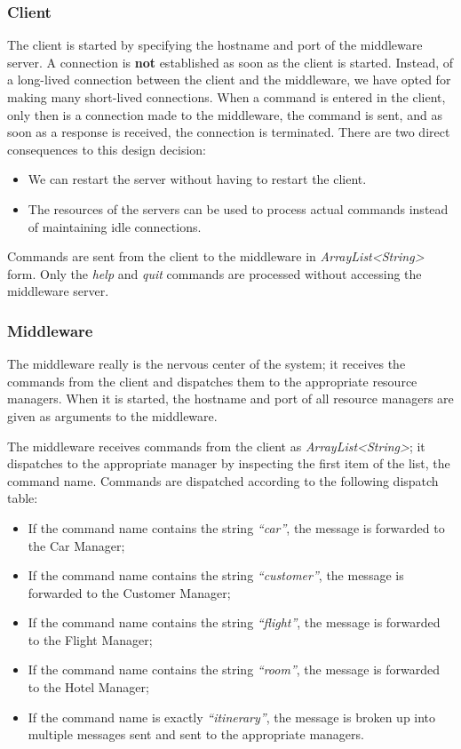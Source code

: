 \documentclass[11pt]{article}
\begin{document}
\subsubsection{Client}

The client is started by specifying the hostname and port of the
middleware server.  A connection is {\bf not} established as soon as
the client is started.  Instead, of a long-lived connection between
the client and the middleware, we have opted for making many
short-lived connections.  When a command is entered in the client,
only then is a connection made to the middleware, the command is sent,
and as soon as a response is received, the connection is terminated.
There are two direct consequences to this design decision:

\begin{itemize}
\item We can restart the server without having to restart the client.
\item The resources of the servers can be used to process actual
  commands instead of maintaining idle connections.
\end{itemize}

Commands are sent from the client to the middleware in
{\it ArrayList<String>} form.  Only the {\it help} and {\it quit}
commands are processed without accessing the middleware server.

\subsubsection{Middleware}

The middleware really is the nervous center of the system; it receives
the commands from the client and dispatches them to the appropriate
resource managers.  When it is started, the hostname and port of all
resource managers are given as arguments to the middleware.

The middleware receives commands from the client as {\it
  ArrayList<String>}; it dispatches to the appropriate manager by
inspecting the first item of the list, the command name.  Commands are
dispatched according to the following dispatch table:


\begin{itemize}
\item If the command name contains the string {\it ``car''}, the
  message is forwarded to the Car Manager;
\item If the command name contains the string {\it ``customer''}, the
  message is forwarded to the Customer Manager;
\item If the command name contains the string {\it ``flight''}, the
  message is forwarded to the Flight Manager;
\item If the command name contains the string {\it ``room''}, the
  message is forwarded to the Hotel Manager;
\item If the command name is exactly {\it ``itinerary''}, the message
  is broken up into multiple messages sent and sent to the appropriate
  managers.
\end{itemize}
\end{document}
